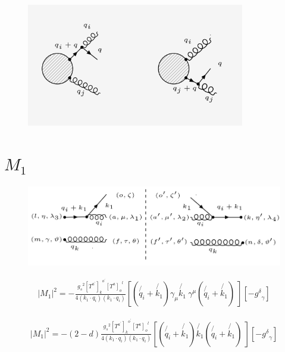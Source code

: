
\begin{figure}[ht!]
\centering
\includegraphics[width=0.85\textwidth]{images/GQ/GQDiagrams.png}
\end{figure}

\pagebreak

\section{$ M_1 $}
\begin{figure}[ht!]
\centering
\includegraphics[scale=0.7]{images/GQ/M1Squer.png}
\end{figure}

\begin{equation}
\begin{split}
|M_1|^2=-\frac{{g_s}^2 {[T^{a^{\prime}}]_k}^{o^{\prime}} {[T^a]_{o}}^{l}}{4(k_1 \cdot q_i)(k_1 \cdot q_i)}[(\not{q_i}+\not{k_1}) {\gamma}_{{\mu}}\not{k_1}\:{\gamma}^{\mu}(\not{q_i}+\not{k_1})\:][-{g^{\delta}}_{\gamma}]
\end{split}
\end{equation}

\begin{equation}
\begin{split}
|M_1|^2=-(2-d)\frac{{g_s}^2 {[T^{a^{\prime}}]_k}^{o^{\prime}} {[T^a]_{o}}^{l}}{4(k_1 \cdot q_i)(k_1 \cdot q_i)}[(\not{q_i}+\not{k_1}) \not{k_1}(\not{q_i}+\not{k_1})\:][-{g^{\delta}}_{\gamma}]
\end{split}
\end{equation}

